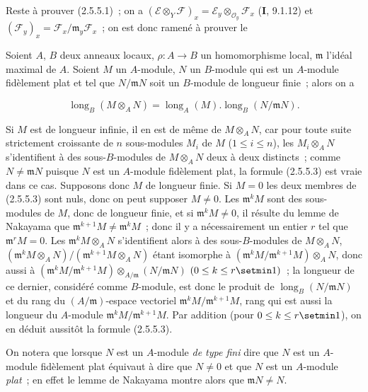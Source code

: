 Reste à prouver (2.5.5.1)~; on a
$(\mathscr E\otimes_Y\mathscr F)_x
=\mathscr E_y\otimes_{\mathcal O_y}\mathscr F_x$
(\textbf{I}, 9.1.12)
et
$(\mathscr F_y)_x=\mathscr F_x/\mathfrak m_y\mathscr F_x$~; on est donc
ramené à prouver le

\begin{lemma}[2.5.5.2]
\label{IV.2.5.5.2-fr}
Soient $A$, $B$ deux anneaux locaux, $\rho:A\to B$ un homomorphisme local,
$\mathfrak m$ l'idéal maximal de $A$. Soient $M$ un $A$-module, $N$ un
$B$-module qui est un $A$-module fidèlement plat et tel que
$N/\mathfrak mN$ soit un $B$-module de longueur finie~; alors on a
\end{lemma}

\begin{env}[2.5.5.3]
\label{IV.2.5.5.3-fr}
\[
\operatorname{long}_B(M\otimes_A N)
=\operatorname{long}_A(M).
 \operatorname{long}_B(N/\mathfrak mN).
\]
\end{env}

Si $M$ est de longueur infinie, il en est de même de $M\otimes_A N$, car
pour toute suite strictement croissante de $n$ sous-modules $M_i$ de $M$
($1\leq i\leq n$), les $M_i\otimes_A N$ s'identifient à des sous-$B$-modules
de $M\otimes_A N$ deux à deux distincts~; comme
$N\ne\mathfrak mN$ puisque $N$ est un $A$-module fidèlement plat, la formule
(2.5.5.3) est vraie dans ce cas. Supposons donc $M$ de longueur finie. Si
$M=0$ les deux membres de (2.5.5.3) sont nuls, donc on peut supposer
$M\ne0$. Les $\mathfrak m^kM$ sont des sous-modules de $M$, donc de longueur
finie, et si $\mathfrak m^kM\ne0$, il résulte du lemme de Nakayama que
$\mathfrak m^{k+1}M\ne\mathfrak m^kM$~; donc il y a nécessairement un entier
$r$ tel que $\mathfrak m^rM=0$. Les
$\mathfrak m^kM\otimes_A N$ s'identifient alors à des sous-$B$-modules de
$M\otimes_A N$,
$(\mathfrak m^kM\otimes_A N)/(\mathfrak m^{k+1}M\otimes_A N)$
étant isomorphe à
$(\mathfrak m^kM/\mathfrak m^{k+1}M)\otimes_A N$,
donc aussi à
$(\mathfrak m^kM/\mathfrak m^{k+1}M)
\otimes_{A/\mathfrak m}(N/\mathfrak mN)$
$(0\leq k\leq r\setmin 1)$~;
la longueur de ce dernier, considéré comme $B$-module, est donc le produit de
$\operatorname{long}_B(N/\mathfrak mN)$ et du rang du
$(A/\mathfrak m)$-espace vectoriel
$\mathfrak m^kM/\mathfrak m^{k+1}M$, rang qui est aussi la longueur du
$A$-module $\mathfrak m^kM/\mathfrak m^{k+1}M$. Par addition (pour
$0\leq k\leq r\setmin 1$), on en déduit aussitôt la formule (2.5.5.3).

\begin{remark}[2.5.5.4]
\label{IV.2.5.5.4-fr}
On notera que lorsque $N$ est un $A$-module \emph{de type fini} dire que $N$
est un $A$-module fidèlement plat équivaut à dire que $N\ne0$ et que $N$ est
un $A$-module \emph{plat}~; en effet le lemme de Nakayama montre alors que
$\mathfrak mN\ne N$.
\end{remark}

